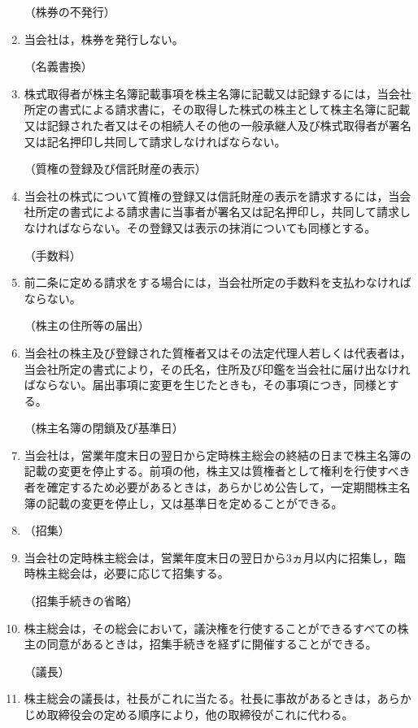 \documentclass[11pt,a4paper]{jsarticle}
\makeatletter
\def\section{\@startsection{section}{1}{-40pt}{15pt}{10pt}{\normalfont\Large\bfseries\centering}}
\newcommand{\header}[1]{\vspace{5pt}\hspace{-42pt}（{#1}）}
\makeatother
\begin{document}
\begin{enumerate}
\header{株券の不発行}
\item 当会社は，株券を発行しない。

\header{名義書換}
\item 株式取得者が株主名簿記載事項を株主名簿に記載又は記録するには，当会社所定の書式による請求書に，その取得した株式の株主として株主名簿に記載又は記録された者又はその相続人その他の一般承継人及び株式取得者が署名又は記名押印し共同して請求しなければならない。

\header{質権の登録及び信託財産の表示}
\item 当会社の株式について質権の登録又は信託財産の表示を請求するには，当会社所定の書式による請求書に当事者が署名又は記名押印し，共同して請求しなければならない。その登録又は表示の抹消についても同様とする。

\header{手数料}
\item 前二条に定める請求をする場合には，当会社所定の手数料を支払わなければならない。

\header{株主の住所等の届出}
\item 当会社の株主及び登録された質権者又はその法定代理人若しくは代表者は，当会社所定の書式により，その氏名，住所及び印鑑を当会社に届け出なければならない。届出事項に変更を生じたときも，その事項につき，同様とする。

\header{株主名簿の閉鎖及び基準日}
\item 当会社は，営業年度末日の翌日から定時株主総会の終結の日まで株主名簿の記載の変更を停止する。前項の他，株主又は質権者として権利を行使すべき者を確定するため必要があるときは，あらかじめ公告して，一定期間株主名簿の記載の変更を停止し，又は基準日を定めることができる。


\section{株主総会}


\item[]
\header{招集}
\item 当会社の定時株主総会は，営業年度末日の翌日から3ヵ月以内に招集し，臨時株主総会は，必要に応じて招集する。

\header{招集手続きの省略}
\item 株主総会は，その総会において，議決権を行使することができるすべての株主の同意があるときは，招集手続きを経ずに開催することができる。

\header{議長}
\item 株主総会の議長は，社長がこれに当たる。社長に事故があるときは，あらかじめ取締役会の定める順序により，他の取締役がこれに代わる。


\end{enumerate}
\end{document}

